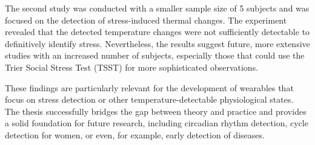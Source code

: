 The second study was conducted with a smaller sample size of 5 subjects and was focused on the detection of stress-induced thermal changes. 
The experiment revealed that the detected temperature changes were not sufficiently detectable to definitively identify stress.
Nevertheless, the results suggest future, more extensive studies with an increased number of subjects, especially those that could use the Trier Social Stress Test (TSST) for more sophisticated observations.

These findings are particularly relevant for the development of wearables that focus on stress detection or other temperature-detectable physiological states. 
The thesis successfully bridges the gap between theory and practice and provides a solid foundation for future research, including circadian rhythm detection, cycle detection for women, or even, for example, early detection of diseases.

\cleardoublepage

